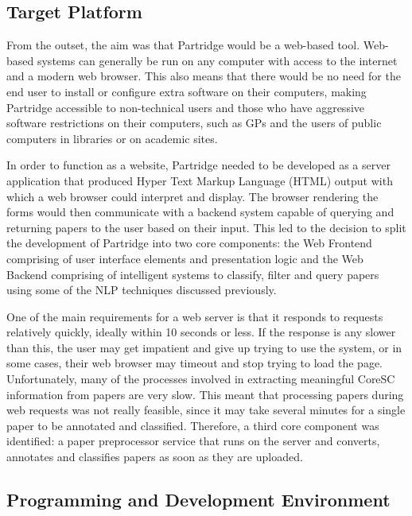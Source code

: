 \subsection{Target Platform}

From the outset, the aim was that Partridge would be a web-based tool.
Web-based systems can generally be run on any computer with access to the
internet and a modern web browser. This also means that there would be no need for
the end user to install or configure extra software on their computers, making
Partridge accessible to non-technical users and those who have aggressive
software restrictions on their computers, such as GPs and the users of public
computers in libraries or on academic sites.

In order to function as a website, Partridge needed to be developed as a server
application that produced Hyper Text Markup Language (HTML) output with which a web
browser could interpret and display. The browser rendering the forms would then
communicate with a backend system capable of querying and returning papers to
the user based on their input. This led to the decision to split the development
of Partridge into two core components: the Web Frontend comprising of user
interface elements and presentation logic and the Web Backend comprising of
intelligent systems to classify, filter and query papers using some of the NLP
techniques discussed previously.

One of the main requirements for a web server is that it responds to requests
relatively quickly, ideally within 10 seconds or less. If the response is any
slower than this, the user may get impatient and give up trying to use the
system, or in some cases, their web browser may timeout and stop trying to load
the page. Unfortunately, many of the processes involved in extracting meaningful CoreSC
information from papers are very slow. This meant that processing papers
during web requests was not really feasible, since it may take several minutes
for a single paper to be annotated and classified. Therefore, a third core
component was identified: a paper preprocessor service that runs on the server
and converts, annotates and classifies papers as soon as they are uploaded.

\subsection{ Programming and Development Environment }

